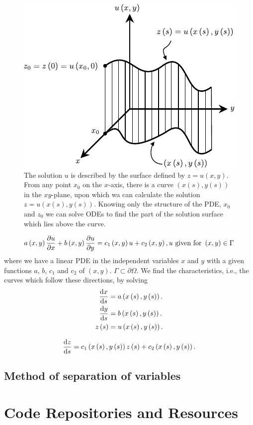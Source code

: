 \begin{figure}[ht!]
	\centering
	\includegraphics[width=0.35\paperwidth]{characteristics}
	\caption{The solution $u$ is described by the surface defined by
		$z=u\left(x,y\right)$.
		From any point $x_{0}$ on the $x$-axis, there is a curve
		$\left(x\left(s\right),y\left(s\right)\right)$ in the
		$xy$-plane, upon which wa can calculate the solution
		$z=u\left(x\left(s\right),y\left(s\right)\right)$.
		Knowing only the structure of the PDE, $x_{0}$ and $z_{0}$ we
		can solve ODEs to find the part of the solution surface which
		lies above the curve.}
\end{figure}

\begin{equation*}
	a\left(x,y\right)\diffp{u}{x}+
	b\left(x,y\right)\diffp{u}{y}=
	c_{1}\left(x,y\right)u+
	c_{2}\left(x,y\right),
	u\text{ given for }\left(x,y\right)\in\Gamma
\end{equation*}
where we have a linear PDE in the independent variables $x$ and $y$
with a given functions $a$, $b$, $c_{1}$ and $c_{2}$ of $\left(x,y\right)$.
$\Gamma\subset\partial\Omega$.
We find the characteristics, i.e., the curves which follow these directions, by solving
\begin{align*}
	\diff{x}{s}     & =
	a\left(x\left(s\right),y\left(s\right)\right). \\
	\diff{y}{s}     & =
	b\left(x\left(s\right),y\left(s\right)\right). \\
	z\left(s\right) & =
	u\left(x\left(s\right),y\left(s\right)\right).
\end{align*}

\begin{equation*}
	\diff{z}{s}=
	c_{1}\left(x\left(s\right),y\left(s\right)\right)
	z\left(s\right)+
	c_{2}\left(x\left(s\right),y\left(s\right)\right).
\end{equation*}

\section{Method of separation of variables}

\chapter{Code Repositories and Resources}

